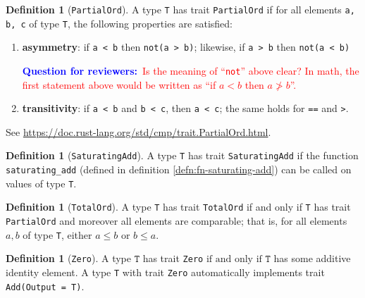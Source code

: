 \documentclass[11pt,a4paper]{article}
\theoremstyle{definition}
\newtheorem{definition}[theorem]{Definition}
\newcommand{\inRust}[2]{See \url{#2}.}
\newcommand{\questionr}[1]{\textcolor{blue}{\textbf{Question for reviewers:}}\textcolor{red}{~#1}}
\newcommand{\T}{\texttt{T}}
\newcommand{\iffText}{\text{if and only if}}
\begin{document}
\begin{definition}[\texttt{PartialOrd}]\label{def:partial}
A type \texttt{T} has trait \texttt{PartialOrd} if for all elements \texttt{a, b, c} of type \texttt{T}, the following properties are satisfied:
    \begin{enumerate}
        \item \textbf{asymmetry}: if \texttt{a < b} then \texttt{not(a > b)}; likewise, if \texttt{a > b} then \texttt{not(a < b)}
        
        \questionr{Is the meaning of ``\texttt{not}'' above clear? In math, the first statement above would be written as ``if $a < b$ then $a \ngtr b$''.}
        
        \item \textbf{transitivity}: if \texttt{a < b} and \texttt{b < c}, then \texttt{a < c}; the same holds for \texttt{==} and \texttt{>}.
    \end{enumerate}
\inRust{Trait std::cmp::PartialOrd}{https://doc.rust-lang.org/std/cmp/trait.PartialOrd.html}
\end{definition}
\begin{definition}[\texttt{SaturatingAdd}]
    A type \texttt{T} has trait \texttt{SaturatingAdd} if the function \texttt{saturating\_add} (defined in definition \ref{defn:fn-saturating-add}) can be called on values of type \texttt{T}.
\end{definition}
\begin{definition}[\texttt{TotalOrd}]
\label{defn:trait-totalord}
    \label{defn:totalord}
    A type \texttt{T} has trait \texttt{TotalOrd} if and only if \texttt{T} has trait \texttt{PartialOrd} and moreover all elements are comparable; that is, for all elements $a, b$ of type \texttt{T}, either $a \leq b$ or $b \leq a$.
    
    
\end{definition}
\begin{definition}[\texttt{Zero}]
A type $\T$ has trait \texttt{Zero} $\iffText$ $\T$ has some additive identity element. A type \texttt{T} with trait \texttt{Zero} automatically implements trait \texttt{Add(Output = T)}.
\end{definition}
\end{document}
